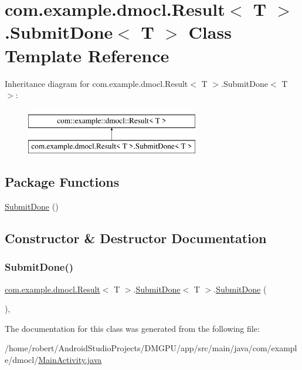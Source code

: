 \hypertarget{classcom_1_1example_1_1dmocl_1_1Result_1_1SubmitDone}{}\section{com.\+example.\+dmocl.\+Result$<$ T $>$.Submit\+Done$<$ T $>$ Class Template Reference}
\label{classcom_1_1example_1_1dmocl_1_1Result_1_1SubmitDone}
Inheritance diagram for com.\+example.\+dmocl.\+Result$<$ T $>$.Submit\+Done$<$ T $>$\+:\begin{figure}[H]
\begin{center}
\leavevmode
\includegraphics[height=2.000000cm]{classcom_1_1example_1_1dmocl_1_1Result_1_1SubmitDone}
\end{center}
\end{figure}
\subsection*{Package Functions}
\begin{DoxyCompactItemize}
\item 
\mbox{\hyperlink{classcom_1_1example_1_1dmocl_1_1Result_1_1SubmitDone_a2481fc5b83b1085d48824b00d342f5c9}{Submit\+Done}} ()
\end{DoxyCompactItemize}


\subsection{Constructor \& Destructor Documentation}
\mbox{\label{classcom_1_1example_1_1dmocl_1_1Result_1_1SubmitDone_a2481fc5b83b1085d48824b00d342f5c9}} 
\subsubsection{\texorpdfstring{Submit\+Done()}{SubmitDone()}}
{\footnotesize\ttfamily \mbox{\hyperlink{classcom_1_1example_1_1dmocl_1_1Result}{com.\+example.\+dmocl.\+Result}}$<$ T $>$.\mbox{\hyperlink{classcom_1_1example_1_1dmocl_1_1Result_1_1SubmitDone}{Submit\+Done}}$<$ T $>$.\mbox{\hyperlink{classcom_1_1example_1_1dmocl_1_1Result_1_1SubmitDone}{Submit\+Done}} (\begin{DoxyParamCaption}{ }\end{DoxyParamCaption})\hspace{0.3cm}{\ttfamily [inline]}, {\ttfamily [package]}}



The documentation for this class was generated from the following file\+:\begin{DoxyCompactItemize}
\item 
/home/robert/\+Android\+Studio\+Projects/\+D\+M\+G\+P\+U/app/src/main/java/com/example/dmocl/\mbox{\hyperlink{MainActivity_8java}{Main\+Activity.\+java}}\end{DoxyCompactItemize}
